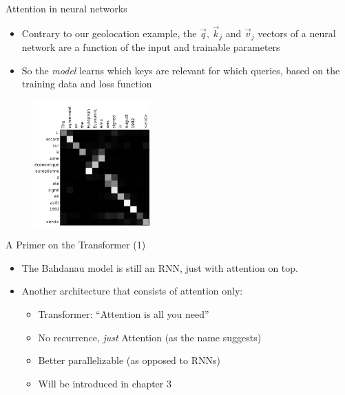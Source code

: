 \begin{vbframe}{Attention in neural networks}

\vskip-2mm
\vfill

\begin{itemize}
\item Contrary to our geolocation example, the $\vec q$, $\vec k_j$ and $\vec v_j$ vectors of a neural network are a function of the input and trainable parameters
\item So the \textit{model} learns which keys are relevant for which queries, based on the training data and loss function
\end{itemize}

\begin{figure}
	\centering
		\includegraphics[width = 4.5cm]{figure/bahdanau4.png}\\ 
\end{figure}

\vfill

\end{vbframe}


\begin{vbframe}{A Primer on the Transformer (1)}

\vfill

\begin{itemize}
	\item The Bahdanau model is still an RNN, just with attention on top.
	\item Another architecture that consists of attention only: 
		\begin{itemize}
			\item Transformer: ``Attention is all you need'' 
			\item No recurrence, \textit{just} Attention (as the name suggests)
			\item Better parallelizable (as opposed to RNNs)
			\item Will be introduced in chapter 3
		\end{itemize}
\end{itemize}

\vfill

\end{vbframe}

